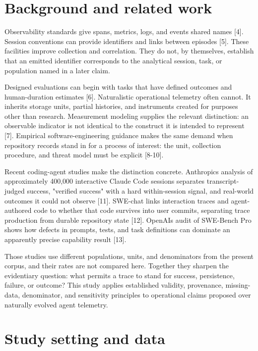\documentclass[12pt]{article}
\begin{document}
\section{Background and related work}\label{background-and-related-work}

Observability standards give spans, metrics, logs, and events shared names {[}4{]}. Session conventions can provide identifiers and links between episodes {[}5{]}. These facilities improve collection and correlation. They do not, by themselves, establish that an emitted identifier corresponds to the analytical session, task, or population named in a later claim.

Designed evaluations can begin with tasks that have defined outcomes and human-duration estimates {[}6{]}. Naturalistic operational telemetry often cannot. It inherits storage units, partial histories, and instruments created for purposes other than research. Measurement modeling supplies the relevant distinction: an observable indicator is not identical to the construct it is intended to represent {[}7{]}. Empirical software-engineering guidance makes the same demand when repository records stand in for a process of interest: the unit, collection procedure, and threat model must be explicit {[}8-10{]}.

Recent coding-agent studies make the distinction concrete. Anthropic\textquotesingle s analysis of approximately 400,000 interactive Claude Code sessions separates transcript-judged success, "verified success" with a hard within-session signal, and real-world outcomes it could not observe {[}11{]}. SWE-chat links interaction traces and agent-authored code to whether that code survives into user commits, separating trace production from durable repository state {[}12{]}. OpenAI\textquotesingle s audit of SWE-Bench Pro shows how defects in prompts, tests, and task definitions can dominate an apparently precise capability result {[}13{]}.

Those studies use different populations, units, and denominators from the present corpus, and their rates are not compared here. Together they sharpen the evidentiary question: what permits a trace to stand for success, persistence, failure, or outcome? This study applies established validity, provenance, missing-data, denominator, and sensitivity principles to operational claims proposed over naturally evolved agent telemetry.

\section{Study setting and data}\label{study-setting-and-data}
\end{document}
